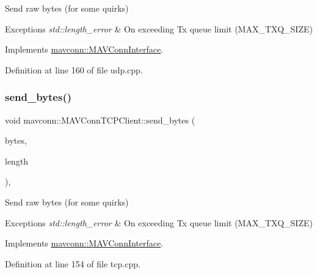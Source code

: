 Send raw bytes (for some quirks) 


\begin{DoxyExceptions}{Exceptions}
{\em std\+::length\+\_\+error} & On exceeding Tx queue limit (M\+A\+X\+\_\+\+T\+X\+Q\+\_\+\+S\+I\+ZE) \\
\hline
\end{DoxyExceptions}


Implements \mbox{\hyperlink{group__mavconn_ga7d00279e176e9a6890ed47ab1ceeb597}{mavconn\+::\+M\+A\+V\+Conn\+Interface}}.



Definition at line 160 of file udp.\+cpp.

\mbox{\label{group__mavconn_gac327ab4a27b6de2da3c594d93c599312}} 
\subsubsection{\texorpdfstring{send\_bytes()}{send\_bytes()}\hspace{0.1cm}{\footnotesize\ttfamily [3/5]}}
{\footnotesize\ttfamily void mavconn\+::\+M\+A\+V\+Conn\+T\+C\+P\+Client\+::send\+\_\+bytes (\begin{DoxyParamCaption}\item[{const uint8\+\_\+t $\ast$}]{bytes,  }\item[{size\+\_\+t}]{length }\end{DoxyParamCaption})\hspace{0.3cm}{\ttfamily [override]}, {\ttfamily [virtual]}}



Send raw bytes (for some quirks) 


\begin{DoxyExceptions}{Exceptions}
{\em std\+::length\+\_\+error} & On exceeding Tx queue limit (M\+A\+X\+\_\+\+T\+X\+Q\+\_\+\+S\+I\+ZE) \\
\hline
\end{DoxyExceptions}


Implements \mbox{\hyperlink{group__mavconn_ga7d00279e176e9a6890ed47ab1ceeb597}{mavconn\+::\+M\+A\+V\+Conn\+Interface}}.



Definition at line 154 of file tcp.\+cpp.

\mbox{\label{group__mavconn_ga4eedf8da39d9dee8cf84074d010ddf0d}} 
